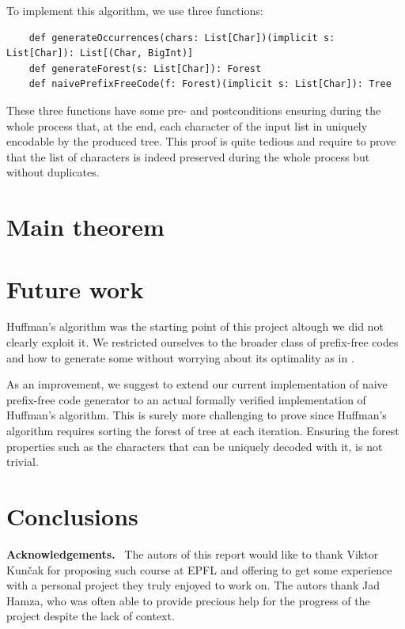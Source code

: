 \documentclass[a4paper,UKenglish,cleveref, autoref, thm-restate]{lipics-v2021}
\begin{document}
To implement this algorithm, we use three functions:
\begin{lstlisting}
    def generateOccurrences(chars: List[Char])(implicit s: List[Char]): List[(Char, BigInt)]
    def generateForest(s: List[Char]): Forest
    def naivePrefixFreeCode(f: Forest)(implicit s: List[Char]): Tree
\end{lstlisting}

These three functions have some pre- and postconditions ensuring during the whole process that, at the end, each character of the input list in uniquely encodable by the produced tree.
This proof is quite tedious and require to prove that the list of characters is indeed preserved during the whole process but without duplicates.

\section{Main theorem}

\section{Future work}

Huffman's algorithm was the starting point of this project altough we did not clearly exploit it. We restricted ourselves to the broader class of prefix-free codes and how to generate some without worrying about its optimality as in \cite{blanchette}. 

As an improvement, we suggest to extend our current implementation of naive prefix-free code generator to an actual formally verified implementation of Huffman's algorithm. This is surely more challenging to prove since Huffman's algorithm requires sorting the forest of tree at each iteration. Ensuring the forest properties such as the characters that can be uniquely decoded with it, is not trivial.

\section{Conclusions}


\vspace{0.5cm} %
\noindent %
\textbf{\large Acknowledgements.}\ %
The autors of this report would like to thank Viktor Kun\v{c}ak for proposing such course at EPFL and offering to get some experience with a personal project they truly enjoyed to work on. The autors thank Jad Hamza, who was often able to provide precious help for the progress of the project despite the lack of context.


\end{document}
